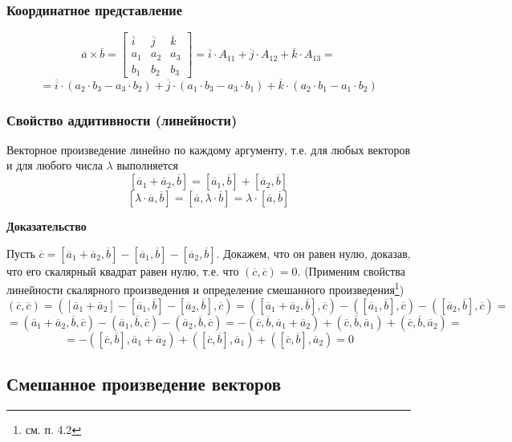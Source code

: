 \documentclass{article}
\newcommand{\n}{\bigbreak}
\begin{document}
\subsubsection{Координатное представление}
\[
    \overline{a}\times\overline{b}
    =
    \begin{bmatrix}
    \overline{i} & \overline{j} & \overline{k} \\
    a_1 & a_2 & a_3 \\
    b_1 & b_2 & b_3
    \end{bmatrix}
    = \overline{i}\cdot A_{11}+\overline{j}\cdot A_{12} +\overline{k}\cdot A_{13} =
\]
\[
    =\overline{i}\cdot(a_2\cdot b_3-a_3\cdot b_2)+\overline{j}\cdot(a_1\cdot b_3-a_3\cdot b_1)+\overline{k}\cdot(a_2\cdot b_1-a_1\cdot b_2)
\]
\subsubsection{Свойство аддитивности (линейности)}
 Векторное произведение линейно по каждому аргументу, т.е. для любых векторов и для любого числа $\lambda$ выполняется
 $$ [\overline{a}_1+\overline{a}_2,\overline{b}]=[\overline{a}_1,\overline{b}]+[\overline{a}_2,\overline{b}] $$
 $$ [\lambda\cdot\overline{a},\overline{b}]=[\overline{a},\lambda\cdot\overline{b}]=\lambda\cdot[\overline{a},\overline{b}] $$

\textbf{Доказательство}

Пусть $\overline{c}=[\overline{a}_1+\overline{a}_2,\overline{b}]-[\overline{a}_1,\overline{b}]-[\overline{a}_2,\overline{b}]$. Докажем, что он равен нулю, доказав, что его скалярный квадрат равен нулю, т.е. что $(\overline{c},\overline{c})=0$. (Применим свойства линейности скалярного произведения и определение смешанного произведения\footnote{см. п. 4.2})
$$ (\overline{c},\overline{c})=([\overline{a}_1+\overline{a}_2]-[\overline{a}_1,\overline{b}]-[\overline{a}_2,\overline{b}],\overline{c})=([\overline{a}_1+\overline{a}_2,\overline{b}],\overline{c})-([\overline{a}_1,\overline{b}],\overline{c})-([\overline{a}_2,\overline{b}],\overline{c})= $$
$$ =(\overline{a}_1+\overline{a}_2,\overline{b},\overline{c})-(\overline{a}_1,\overline{b},\overline{c})-(\overline{a}_2,\overline{b},\overline{c}) =-(\overline{c},\overline{b},\overline{a}_1+\overline{a}_2)+(\overline{c},\overline{b},\overline{a}_1)+(\overline{c},\overline{b},\overline{a}_2)=$$
$$ =-([\overline{c},\overline{b}],\overline{a}_1+\overline{a}_2)+([\overline{c},\overline{b}],\overline{a}_1)+([\overline{c},\overline{b}],\overline{a}_2)=0 $$
\n
\n
\n
\subsection{Смешанное произведение векторов}
\end{document}
